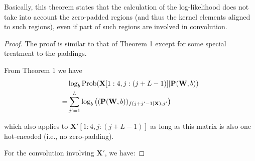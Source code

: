 \documentclass[12pt]{article}
\newcommand{\matrixSymbol}[1]{\mathbf{#1}}
\begin{document}
Basically, this theorem states that the calculation of the log-likelihood does not take into account the zero-padded regions (and thus the kernel elements aligned to such regions), even if part of such regions are involved in convolution.


\begin{proof}
The proof is similar to that of Theorem 1 except for some special treatment to the paddings.

From Theorem 1 we have
\begin{align} 
  & \log_{b}{\mathrm{Prob}(\matrixSymbol{X}[1:4, j:(j+L-1)]|\matrixSymbol{P}(\matrixSymbol{W}, b))} \notag \\
= & \sum_{j'=1}^{L}{\log_{b}{\left( (\matrixSymbol{P}(\matrixSymbol{W}, b))_{f(j + j' - 1|\matrixSymbol{X}), j'}\right)}}
\end{align}

which also applies to $\matrixSymbol{X'}[1:4, j:(j+L-1)]$ as long as this matrix is also one hot-encoded (i.e., no zero-padding).

For the convolution involving $\matrixSymbol{X'}$, we have:


\end{proof}
\end{document}
